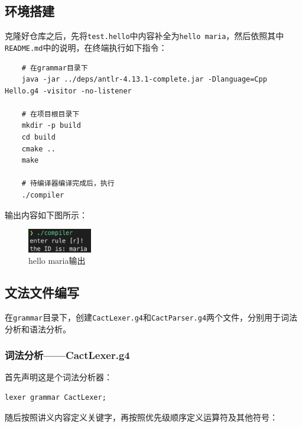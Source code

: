 \documentclass[UTF8]{report}
\begin{document}
\subsection{环境搭建}

克隆好仓库之后，先将\texttt{test.hello}中内容补全为\texttt{hello maria}，然后依照其中\texttt{README.md}中的说明，在终端执行如下指令：

\begin{lstlisting}
    # 在grammar目录下
    java -jar ../deps/antlr-4.13.1-complete.jar -Dlanguage=Cpp Hello.g4 -visitor -no-listener

    # 在项目根目录下
    mkdir -p build
    cd build
    cmake ..
    make

    # 待编译器编译完成后，执行
    ./compiler
\end{lstlisting}

输出内容如下图所示：

\begin{figure}[H]
    \centering
    \includegraphics[width=0.25\textwidth]{fig/hello.png}
    \caption{hello maria输出}
\end{figure}

\subsection{文法文件编写}

在\texttt{grammar}目录下，创建\texttt{CactLexer.g4}和\texttt{CactParser.g4}两个文件，分别用于词法分析和语法分析。

\subsubsection{词法分析——CactLexer.g4}

首先声明这是个词法分析器：
\begin{lstlisting}[language=antlr]
    lexer grammar CactLexer;
\end{lstlisting}

随后按照讲义内容定义关键字，再按照优先级顺序定义运算符及其他符号：
\end{document}
